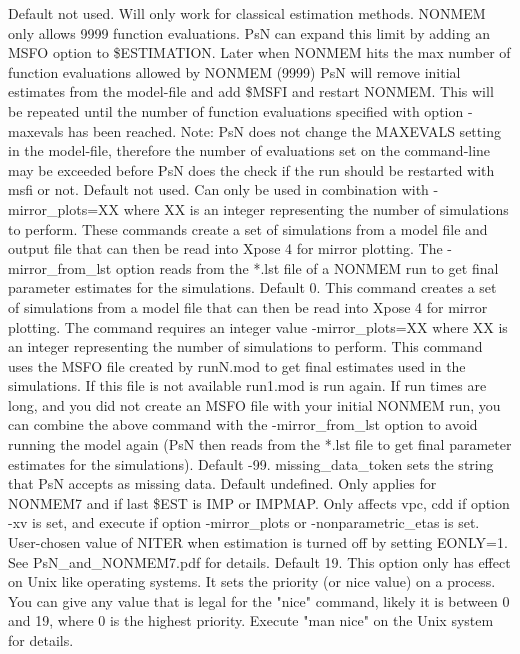 \begin{optionlist}
\nextopt
{}
Default not used. Will only work for classical estimation methods. NONMEM only allows 9999 function evaluations. PsN can expand this limit by adding an MSFO option to \$ESTIMATION. Later when NONMEM hits the max number of function evaluations allowed by NONMEM (9999) PsN will remove initial estimates from the model-file and add \$MSFI and restart NONMEM. This will be repeated until the number of function evaluations specified with option -maxevals has been reached. Note: PsN does not change the MAXEVALS setting in the model-file, therefore the number of evaluations set on the command-line may be exceeded before PsN does the check if the run should be restarted with msfi or not. 
\nextopt
{}
Default not used. Can only be used in combination with -mirror\_plots=XX where XX is an integer representing the number of simulations to perform.  These commands create a set of simulations from a model file and output file that can then be read into Xpose 4 for mirror plotting.  The -mirror\_from\_lst option reads from the *.lst file of a NONMEM run to get final parameter estimates for the simulations. 
\nextopt
{}
Default 0. This command creates a set of simulations from a model file that can then be read into Xpose 4 for mirror plotting. The command requires an integer value -mirror\_plots=XX where XX is an integer representing the number of simulations to perform. This command uses the MSFO file created by runN.mod to get final estimates used in the simulations. If this file is not available run1.mod is run again.  If run times are long, and you did not create an MSFO file with your initial NONMEM run, you can combine the above command with the -mirror\_from\_lst option to avoid running the model again (PsN then reads from the *.lst file to get final parameter estimates for the simulations). 
\nextopt
{}
Default -99. missing\_data\_token sets the string that PsN accepts as missing data. 
\nextopt
{}
Default undefined. Only applies for NONMEM7 and if last \$EST is IMP or IMPMAP. Only affects vpc,  cdd if option -xv is set, and execute if option -mirror\_plots or -nonparametric\_etas is set. User-chosen value of NITER when estimation is turned off by setting EONLY=1. See PsN\_and\_NONMEM7.pdf for details. 
\nextopt
{}
Default 19. This option only has effect on Unix like operating systems. It  sets the priority (or nice value) on a process. You can give any value that is legal for the "nice" command, likely it is between 0 and 19, where 0 is the highest priority. Execute "man nice" on the Unix system for details. 

\end{optionlist}
